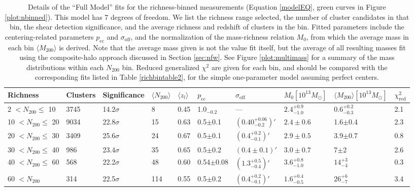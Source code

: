 \begin{landscape}

\begin{table}
\centering
    \caption[Shear Results for Richness-Binned Clusters (Full Model)]{Details of the ``Full Model'' fits for the richness-binned measurements (Equation \ref{modelEQ}, green curves in Figure \ref{plot:nbinned}). This model has 7 degrees of freedom. We list the richness range selected, the number of cluster candidates in that bin, the shear detection significance, and the average richness and redshift of clusters in the bin. Fitted parameters include the centering-related parameters $p_{\mathrm{cc}}$ and $\sigma_{\mathrm{off}}$, and the normalization of the mass-richness relation $M_0$, from which the average mass in each bin $\langle M_{200} \rangle$ is derived. Note that the average mass given is not the value fit itself, but the average of all resulting masses fit using the composite-halo approach discussed in Section \ref{sec:nfw}. See Figure \ref{plot:multimass} for a summary of the mass distributions within each $N_{200}$ bin. Reduced generalized $\chi^2$ are given for each bin, and should be compared with the corresponding fits listed in Table \ref{richbintable2}, for the simple one-parameter model assuming perfect centers.}
    \begin{tabular}{llllllllll}
      \hline
      Richness & Clusters & Significance & $\langle N_{200} \rangle$ & $\langle z_l \rangle$ & $p_{\mathrm{cc}}$ & $\sigma_{\mathrm{off}}$ & $M_0 \left[ 10^{13} M_{\odot}\right]$ & $\langle M_{200} \rangle \left[ 10^{13} M_{\odot}\right]$ & $\chi^2_{\mathrm{red}}$ \\ \hline
      2 $<N_{200}\leq$ 10 & 3745 & 14.2$\sigma$ & 8 & 0.45 & 1.0$_{-0.2}$ & \---- & $2.4^{+0.9}_{-1.0}$ & $0.6^{+0.2}_{-0.3}$ & 2.1  \\
      10 $<N_{200}\leq$ 20 & 9034 & 22.8$\sigma$ & 15 & 0.63 & 0.5$\pm$0.1 & $(0.40^{+0.06}_{-0.2})'$ & $2.4\pm0.6$ & 1.6$\pm$0.4 & 2.3 \\
      20 $<N_{200}\leq$ 30 & 3409 & 25.6$\sigma$ & 24 & 0.67 & 0.5$\pm$0.1 & $(0.4^{+0.2}_{-0.1})'$ & $2.9\pm0.5$ & 3.9$\pm$0.7 & 0.8 \\
      30 $<N_{200}\leq$ 40 & 986 & 23.4$\sigma$ & 35 & 0.65 & 0.5$\pm$0.2 & $(0.4\pm0.1)'$ & $3.0\pm0.7$ & 7$\pm$2 & 2.6 \\
      40 $<N_{200}\leq$ 60 & 568 & 22.2$\sigma$ & 48 & 0.60 & 0.54$\pm$0.08 & $(1.3^{+0.5}_{-0.4})'$ & $3.6^{+0.8}_{-1.0}$ & $14^{+3}_{-4}$ & 0.3 \\
      60 $<N_{200}$ & 314 & 22.5$\sigma$ & 114 & 0.55 & 0.5$\pm$0.2 & $(0.4^{+0.2}_{-0.1})'$ & $1.6^{+0.4}_{-0.5}$ & 26$^{+6}_{-7}$ & 3.4 \\
      \hline
    \end{tabular}
\label{richbintable1}
\end{table}


\end{landscape}
